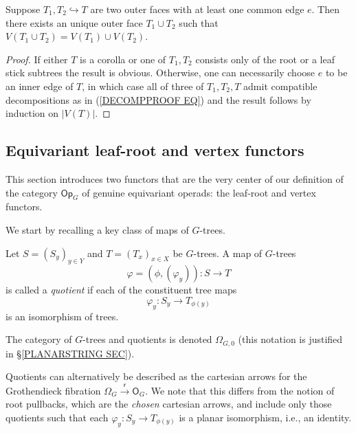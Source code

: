 \documentclass[a4paper,10pt]{article}%
\begin{document}
\begin{lemma}\label{OUTERFACEUNION LEM}
	Suppose $T_1,T_2 \hookrightarrow T$ are two outer faces with at least one common edge $e$. Then there exists an unique outer face $T_1 \cup T_2$ such that 
	$V(T_1 \cup T_2) = V(T_1) \cup V(T_2)$.
\end{lemma}

\begin{proof}
	If either $T$ is a corolla or one of $T_1,T_2$ consists only of the root or a leaf  stick subtrees the result is obvious.
	Otherwise, one can necessarily choose $e$ to be an inner edge of $T$, in which case all of three of $T_1,T_2,T$ admit compatible decompositions as in (\ref{DECOMPPROOF EQ}) and the result follows by induction on $|V(T)|$.
\end{proof}



\subsection{Equivariant leaf-root and vertex functors}\label{LRVERT SEC}


This section introduces two functors that are the very center of our definition of the category $\mathsf{Op}_G$ of
genuine equivariant operads: the leaf-root and vertex functors.

We start by recalling a key class of maps of $G$-trees.


\begin{definition}\label{QUOT DEF}
	Let $S = (S_y)_{y \in Y}$ and $T = (T_x)_{x \in X}$
	be $G$-trees.
	A map of $G$-trees 
	\[
	\varphi = (\phi, (\varphi_y))\colon S \to T
	\]
	is called a \textit{quotient} if each of the constituent tree maps
	\[
	\varphi_y \colon S_y \to T_{\phi(y)}
	\]
is an isomorphism of trees.	

The category of $G$-trees and quotients is denoted $\Omega_{G,0}$ (this notation is justified in \S \ref{PLANARSTRING SEC}).
\end{definition}


\begin{remark}
	Quotients can alternatively be described as the cartesian arrows for the Grothendieck fibration
	$\Omega_G \xrightarrow{\mathsf{r}} \mathsf{O}_G$.
	We note that this differs from the notion of root pullbacks, which are the \textit{chosen} cartesian arrows, and include only those quotients such that each
	$\varphi_y \colon S_y \to T_{\phi(y)}$
	is a planar isomorphism, i.e., an identity.
\end{remark}
\end{document}
